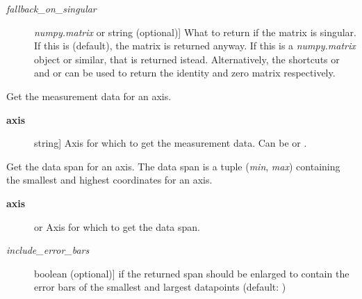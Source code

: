 \documentclass[a4paper,10pt,english]{sphinxmanual}
\begin{document}
\begin{fulllineitems}
\begin{fulllineitems}
\begin{description}
\item[{\emph{fallback\_on\_singular}}] \leavevmode{[}\emph{numpy.matrix} or string (optional){]}
What to return if the matrix is singular. If this is 
(default), the matrix is returned anyway. If this is a
\emph{numpy.matrix} object or similar, that is returned istead.
Alternatively, the shortcuts  or  and 
or  can be used to return the identity and zero matrix
respectively.

\end{description}

\end{fulllineitems}


\begin{fulllineitems}
\label{index:kafe.dataset.Dataset.get_data}
Get the measurement data for an axis.
\begin{description}
\item[{\textbf{axis}}] \leavevmode{[}string{]}
Axis for which to get the measurement data. Can be  or
.

\end{description}

\end{fulllineitems}


\begin{fulllineitems}
\label{index:kafe.dataset.Dataset.get_data_span}
Get the data span for an axis. The data span is a tuple (\emph{min}, \emph{max})
containing the smallest and highest coordinates for an axis.
\begin{description}
\item[{\textbf{axis}}] \leavevmode{[} or \code{'y'}{]}
Axis for which to get the data span.

\item[{\emph{include\_error\_bars}}] \leavevmode{[}boolean (optional){]}
 if the returned span should be enlarged to
contain the error bars of the smallest and largest datapoints
(default: )

\end{description}

\end{fulllineitems}


\end{fulllineitems}
\end{document}
